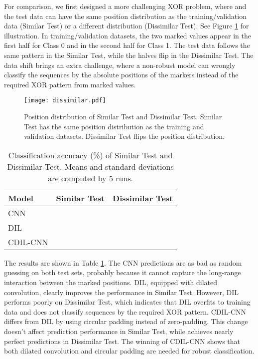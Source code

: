 \documentclass{article}
\begin{document}
For comparison, we first designed a more challenging XOR problem, where  and the test data can have the same position distribution as the training/validation data (Similar Test) or a different distribution (Dissimilar Test). See Figure \ref{fig:dissimilar} for illustration. In training/validation datasets, the two marked values appear in the first half for Class 0 and in the second half for Class 1. The test data follows the same pattern in the Similar Test, while the halves flip in the Dissimilar Test. The data shift brings an extra challenge, where a non-robust model can wrongly classify the sequences by the absolute positions of the markers instead of the required XOR pattern from marked values.


\begin{figure}[tb]
	\centering
	\texttt{[image: dissimilar.pdf]}
	\caption{Position distribution of Similar Test and Dissimilar Test. Similar Test has the same position distribution as the training and validation datasets. Dissimilar Test flips the position distribution.}
	\label{fig:dissimilar}
\end{figure}

\begin{table}[tb]
\centering
\caption{Classification accuracy (\%) of Similar Test and Dissimilar Test. Means and standard deviations are computed by 5 runs.}
\label{table:dissimilar}
\renewcommand{\arraystretch}{1.2}
\begin{tabular}{lcc}
\hline
\hline
Model       & Similar Test   & Dissimilar Test   \\
\hline
CNN         &        &        \\
\hline
DIL         &        &        \\
\hline
CDIL-CNN    &        &        \\
\hline
\hline
\end{tabular}
\end{table}

The results are shown in Table \ref{table:dissimilar}. The CNN predictions are as bad as random guessing on both test sets, probably because it cannot capture the long-range interaction between the marked positions. DIL, equipped with dilated convolution, clearly improves the performance in Similar Test. However, DIL performs poorly on Dissimilar Test, which indicates that DIL overfits to training data and does not classify sequences by the required XOR pattern. CDIL-CNN differs from DIL by using circular padding instead of zero-padding. This change doesn't affect prediction performance in Similar Test, while achieves nearly perfect predictions in Dissimilar Test. The winning of CDIL-CNN shows that both dilated convolution and circular padding are needed for robust classification.
\end{document}
